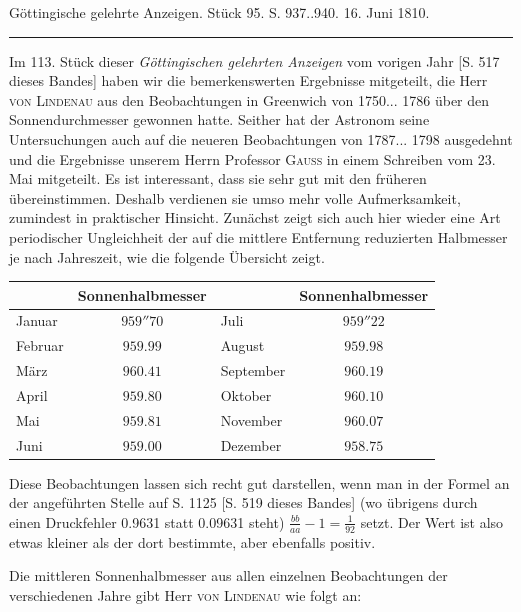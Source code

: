 \clearpage
{}
\hypertarget{native-530-lower}{}\label{native-530-lower}
\begin{center}\small Göttingische gelehrte Anzeigen. Stück 95. S. 937..940. 16. Juni 1810.\\[3pt]\rule{.72\linewidth}{.3pt}\end{center}

Im 113. Stück dieser \emph{Göttingischen gelehrten Anzeigen} vom vorigen Jahr [S. 517 dieses Bandes] haben wir die bemerkenswerten Ergebnisse mitgeteilt, die Herr \textsc{von Lindenau} aus den Beobachtungen in Greenwich von 1750... 1786 über den Sonnendurchmesser gewonnen hatte. Seither hat der Astronom seine Untersuchungen auch auf die neueren Beobachtungen von 1787... 1798 ausgedehnt und die Ergebnisse unserem Herrn Professor \textsc{Gauss} in einem Schreiben vom 23. Mai mitgeteilt. Es ist interessant, dass sie sehr gut mit den früheren übereinstimmen. Deshalb verdienen sie umso mehr volle Aufmerksamkeit, zumindest in praktischer Hinsicht. Zunächst zeigt sich auch hier wieder eine Art periodischer Ungleichheit der auf die mittlere Entfernung reduzierten Halbmesser je nach Jahreszeit, wie die folgende Übersicht zeigt.

\begin{center} \begin{tabular}{l|c||l|c} & Sonnenhalbmesser & & Sonnenhalbmesser \\ \hline Januar & $959''70$ & Juli & $959''22$ \\ Februar & $959.99$ & August & $959.98$ \\ März & $960.41$ & September & $960.19$ \\ April & $959.80$ & Oktober & $960.10$ \\ Mai & $959.81$ & November & $960.07$ \\ Juni & $959.00$ & Dezember & $958.75$ \\ \end{tabular} \end{center}

Diese Beobachtungen lassen sich recht gut darstellen, wenn man in der Formel an der angeführten Stelle auf S. 1125 [S. 519 dieses Bandes] (wo übrigens durch einen Druckfehler 0.9631 statt 0.09631 steht) $\frac{bb}{aa} - 1 = \frac{1}{92}$ setzt. Der Wert ist also etwas kleiner als der dort bestimmte, aber ebenfalls positiv.

Die mittleren Sonnenhalbmesser aus allen einzelnen Beobachtungen der verschiedenen Jahre gibt Herr \textsc{von Lindenau} wie folgt an:

